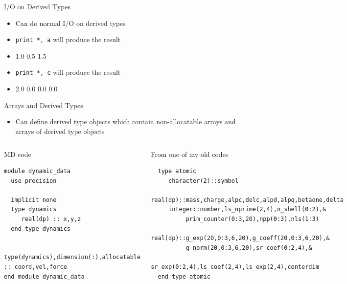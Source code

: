 \documentclass[slidestop,mathserif,compress,xcolor=svgnames]{beamer}
\newenvironment{ablock}[0]
{
\begin{beamerboxesrounded}[upper=uppercol,lower=lowercol,shadow=true]}
{\end{beamerboxesrounded}}
\newenvironment{eblock}[0]
{
\begin{beamerboxesrounded}[upper=uppercol2,lower=lowercol2,shadow=true]}
{\end{beamerboxesrounded}}
\begin{document}
\begin{frame}
\begin{itemize}
{    }
  \end{itemize}
  \framebreak
  \begin{block}{\scriptsize I/O on Derived Types}
    \begin{itemize}
      \item Can do normal I/O on derived types
      \item[] \texttt{print *, a} will produce the result
      \item[] 1.0  0.5  1.5
      \item[] \texttt{print *, c} will produce the result
      \item[] 2.0  0.0  0.0  0.0
    \end{itemize}
  \end{block}
  \framebreak
  \begin{block}{\scriptsize Arrays and Derived Types}
    \begin{itemize}
      \item Can define derived type objects which contain non-allocatable arrays and arrays of derived type objects
    \end{itemize}
  \end{block}

  {\fontsize{4}{5}
    \begin{columns}
      \column{5cm}
      \begin{eblock}{MD code}
        \begin{verbatim}
module dynamic_data
  use precision

  implicit none
  type dynamics
     real(dp) :: x,y,z
  end type dynamics

  type(dynamics),dimension(:),allocatable :: coord,vel,force
end module dynamic_data
        \end{verbatim}
      \end{eblock}
      \column{5cm}
      \begin{ablock}{From one of my old codes}
        \begin{verbatim}
  type atomic
     character(2)::symbol
     real(dp)::mass,charge,alpc,delc,alpd,alpq,betaone,delta
     integer::number,ls_nprime(2,4),n_shell(0:2),&
          prim_counter(0:3,20),npp(0:3),nls(1:3)
     real(dp)::g_exp(20,0:3,6,20),g_coeff(20,0:3,6,20),&
          g_norm(20,0:3,6,20),sr_coef(0:2,4),&
          sr_exp(0:2,4),ls_coef(2,4),ls_exp(2,4),centerdim
  end type atomic
        \end{verbatim}
      \end{ablock}
    \end{columns}
  }
  

\end{frame}
\end{document}
